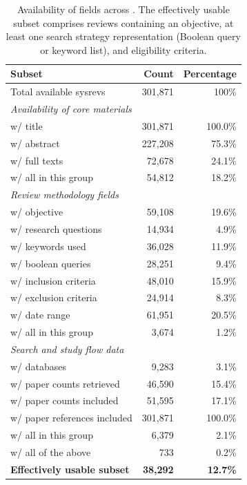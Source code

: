 \begin{table}[t]
\centering
\sffamily
\renewcommand{\arraystretch}{1.2}
\caption{Availability of fields across \webisSRCorpus. 
The effectively usable subset comprises reviews containing an objective, at least one search strategy representation (Boolean query or keyword list), and eligibility criteria.}

\begin{tabular*}{\columnwidth}{@{\extracolsep{\fill}}lrr}
\toprule
\textbf{Subset} & \textbf{Count} & \textbf{Percentage} \\
\midrule
Total available sysrevs & 301,871 & 100\% \\
\midrule
\multicolumn{3}{l}{\textit{Availability of core materials}} \\
w/ title & 301,871 & 100.0\% \\
w/ abstract & 227,208 & 75.3\% \\
w/ full texts & 72,678 & 24.1\% \\
w/ all in this group & 54,812 & 18.2\% \\
\midrule
\multicolumn{3}{l}{\textit{Review methodology fields}} \\
w/ objective & 59,108 & 19.6\% \\
w/ research questions & 14,934 & 4.9\% \\
w/ keywords used & 36,028 & 11.9\% \\
w/ boolean queries & 28,251 & 9.4\% \\
w/ inclusion criteria & 48,010 & 15.9\% \\
w/ exclusion criteria & 24,914 & 8.3\% \\
w/ date range & 61,951 & 20.5\% \\
w/ all in this group & 3,674 & 1.2\% \\
\midrule
\multicolumn{3}{l}{\textit{Search and study flow data}} \\
w/ databases & 9,283 & 3.1\% \\
w/ paper counts retrieved & 46,590 & 15.4\% \\
w/ paper counts included & 51,595 & 17.1\% \\
w/ paper references included & 301,871 & 100.0\% \\
w/ all in this group & 6,379 & 2.1\% \\
\midrule
w/ all of the above & 733 & 0.2\% \\
\midrule
\textbf{Effectively usable subset} & \textbf{38,292} & \textbf{12.7\%} \\
\bottomrule
\end{tabular*}
\label{tab:sysrev_field_coverage}
\end{table}
